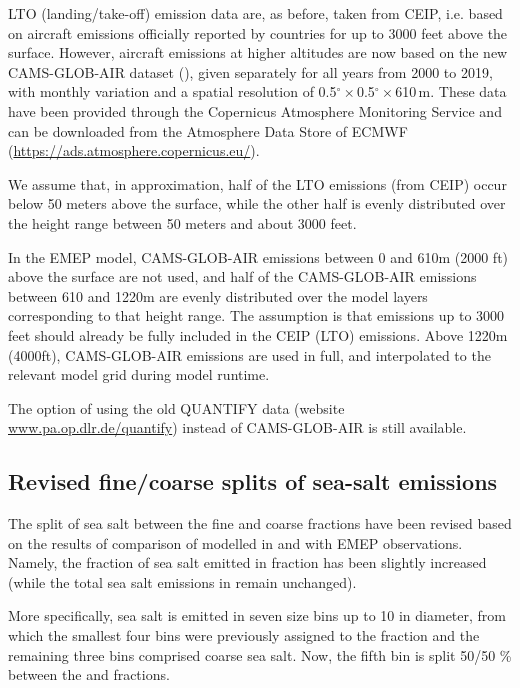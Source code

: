 LTO (landing/take-off) emission data are, as before, taken from CEIP, i.e. based on aircraft emissions officially reported by countries for up to 3000 feet above the surface. However, aircraft emissions at higher altitudes are now based on the new CAMS-GLOB-AIR dataset (\citet{GranierCAMS2019}), given separately for all years from 2000 to 2019, with monthly variation and a spatial resolution of 0.5$^\circ$\,$\times$\,0.5$^\circ$\,$\times$\,610\,m. These data have been provided through the Copernicus Atmosphere Monitoring Service and can be downloaded from the Atmosphere Data Store of ECMWF (\url{https://ads.atmosphere.copernicus.eu/}).

We assume that, in approximation, half of the LTO emissions (from CEIP) occur below 50 meters above the surface, while the other half is evenly distributed over the height range between 50 meters and about 3000 feet.

In the EMEP model, CAMS-GLOB-AIR emissions between 0 and 610m (2000 ft) above the surface are not used, and half of the CAMS-GLOB-AIR emissions between 610 and 1220m are evenly distributed over the model layers corresponding to that height range. The assumption is that emissions up to 3000 feet should already be fully included in the CEIP (LTO) emissions. Above 1220m (4000ft), CAMS-GLOB-AIR emissions are used in full, and interpolated to the relevant model grid during model runtime.

The option of using the old QUANTIFY data (website \url{www.pa.op.dlr.de/quantify}) instead of CAMS-GLOB-AIR is still available.

\subsection{Revised fine/coarse splits of sea-salt emissions}
\label{ssec:updateSS}

The split of sea salt between the fine and coarse fractions have been revised based on the results of comparison of modelled  in \PM[2.5] and \PM[10] with EMEP observations. Namely, the fraction of sea salt emitted in \PM[2.5] fraction has been slightly increased (while the total sea salt emissions in \PM[10] remain unchanged). 

More specifically, sea salt is emitted in seven size bins up to 10 \um in diameter, from which the smallest four bins were previously assigned to the \PM[2.5] fraction and the remaining three bins comprised coarse sea salt. Now, the fifth bin is split 50/50 \% between the \PM[2.5] and \PM[2.5-10] fractions.  


